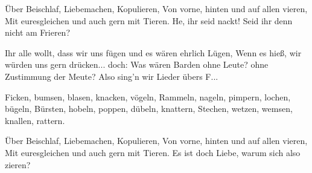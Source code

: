 \begin{guitar}
	Über Beischlaf, Liebemachen, Kopulieren,
	Von vorne, hinten und auf allen vieren,
	Mit euresgleichen und auch gern mit Tieren. 
	He, ihr seid nackt! Seid ihr denn nicht am Frieren?
	
	Ihr alle wollt, dass wir uns fügen und es wären ehrlich Lügen,
	Wenn es hieß, wir würden uns gern drücken... doch:
	Was wären Barden ohne Leute? ohne Zustimmung der Meute?
	Also sing'n wir Lieder übers F...
	
	Ficken, bumsen, blasen, knacken, vögeln,
	Rammeln, nageln, pimpern, lochen, bügeln,
	Bürsten, hobeln, poppen, dübeln, knattern,
	Stechen, wetzen, wemsen, knallen, rattern.
	
	Über Beischlaf, Liebemachen, Kopulieren,
	Von vorne, hinten und auf allen vieren,
	Mit euresgleichen und auch gern mit Tieren. 
	Es ist doch Liebe, warum sich also zieren?
\end{guitar}



